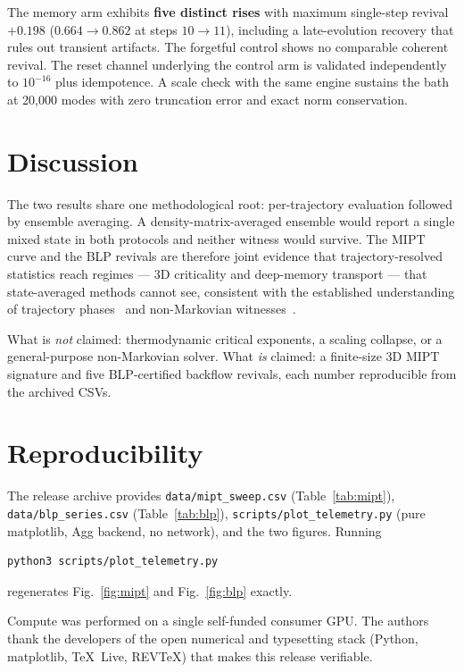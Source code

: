 \documentclass[aps,pra,preprint,superscriptaddress]{revtex4-2}
\begin{document}
The memory arm exhibits \textbf{five distinct rises} with maximum
single-step revival \textbf{$+0.198$} ($0.664 \to 0.862$ at steps
$10 \to 11$), including a late-evolution recovery that rules out transient
artifacts.  The forgetful control shows no comparable coherent revival.  The
reset channel underlying the control arm is validated independently to
$10^{-16}$ plus idempotence.  A scale check with the same engine sustains the
bath at 20{,}000 modes with zero truncation error and exact norm
conservation.

\section{Discussion}

The two results share one methodological root: per-trajectory evaluation
followed by ensemble averaging.  A density-matrix-averaged ensemble would
report a single mixed state in both protocols and neither witness would
survive.  The MIPT curve and the BLP revivals are therefore joint evidence
that trajectory-resolved statistics reach regimes --- 3D criticality and
deep-memory transport --- that state-averaged methods cannot see, consistent
with the established understanding of trajectory phases~\cite{FisherReview2023}
and non-Markovian witnesses~\cite{RivasHuelgaPlenio2014}.

What is \emph{not} claimed: thermodynamic critical exponents, a scaling
collapse, or a general-purpose non-Markovian solver.  What \emph{is} claimed:
a finite-size 3D MIPT signature and five BLP-certified backflow revivals,
each number reproducible from the archived CSVs.

\section{Reproducibility}

The release archive provides \texttt{data/mipt\_sweep.csv} (Table~\ref{tab:mipt}),
\texttt{data/blp\_series.csv} (Table~\ref{tab:blp}),
\texttt{scripts/plot\_telemetry.py} (pure matplotlib, Agg backend, no network),
and the two figures.  Running
\begin{verbatim}
python3 scripts/plot_telemetry.py
\end{verbatim}
regenerates Fig.~\ref{fig:mipt} and Fig.~\ref{fig:blp} exactly.

\begin{acknowledgments}
Compute was performed on a single self-funded consumer GPU.  The authors thank
the developers of the open numerical and typesetting stack (Python,
matplotlib, TeX~Live, REVTeX) that makes this release verifiable.
\end{acknowledgments}
\end{document}
